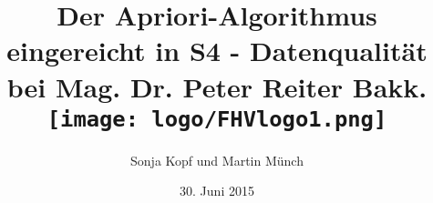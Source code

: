 \title{
	{Der Apriori-Algorithmus}\\
	{\large eingereicht in S4 - Datenqualität}\\
	{\large bei Mag. Dr. Peter Reiter Bakk.}\\ [1cm]
	{\texttt{[image: logo/FHVlogo1.png]}} \\ [1cm]
}
\author{Sonja Kopf und Martin Münch}
\date{30. Juni 2015}



\maketitle

